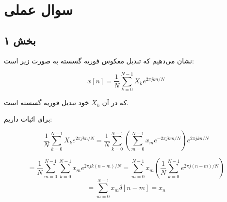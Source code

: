 \documentclass[12pt]{article}
\begin{document}
 \newpage
\section{سوال عملی}

\subsection{بخش ۱}

نشان می‌دهیم که تبدیل معکوس فوریه گسسته به صورت زیر است:

$$x[n] = \frac{1}{N} \sum_{k=0}^{N-1} X_k e^{2\pi j k n / N}$$

که در آن $X_k$ خود تبدیل فوریه گسسته است.

برای اثبات داریم:

$$\frac{1}{N} \sum_{k=0}^{N-1} X_k e^{2\pi j k n /N} = \frac{1}{N} \sum_{k=0}^{N-1}(\sum_{m=0}^{N-1} x_m e^{- 2\pi j k m/N})e^{2 \pi j k n /N}$$

$$= \frac{1}{N}\sum_{m=0}^{N-1}\sum_{k=0}^{N-1} x_m e^{2\pi j k(n-m)/N} = \sum_{m=0}^{N-1} x_m (\frac{1}{N} \sum_{k=0}^{N-1} e^{2 \pi j (n-m)/N})$$
$$=\sum_{m=0}^{N-1} x_m \delta[n-m] = x_n$$

 
\end{document}
